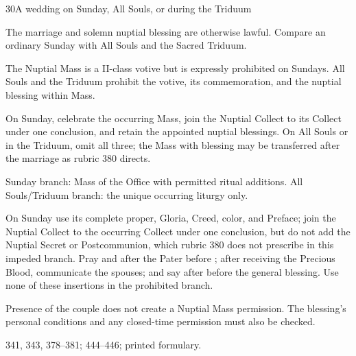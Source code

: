 \begin{casefile}{30}{A wedding on Sunday, All Souls, or during the Triduum}
\item[Calendar facts] The marriage and solemn nuptial blessing are otherwise lawful.  Compare an ordinary Sunday with All Souls and the Sacred Triduum.
\item[Ranks and rows] The Nuptial Mass is a II-class votive but is expressly prohibited on Sundays.  All Souls and the Triduum prohibit the votive, its commemoration, and the nuptial blessing within Mass.
\item[Impeded item] On Sunday, celebrate the occurring Mass, join the Nuptial Collect to its Collect under one conclusion, and retain the appointed nuptial blessings.  On All Souls or in the Triduum, omit all three; the Mass with blessing may be transferred after the marriage as rubric 380 directs.
\item[Mass category] Sunday branch: Mass of the Office with permitted ritual additions.  All Souls/Triduum branch: the unique occurring liturgy only.
\item[Assembly] On Sunday use its complete proper, Gloria, Creed, color, and Preface; join the Nuptial Collect to the occurring Collect under one conclusion, but do not add the Nuptial Secret or Postcommunion, which rubric 380 does not prescribe in this impeded branch.  Pray  and  after the Pater before ; after receiving the Precious Blood, communicate the spouses; and say  after  before the general blessing.  Use none of these insertions in the prohibited branch.
\item[Boundary] Presence of the couple does not create a Nuptial Mass permission.  The blessing's personal conditions and any closed-time permission must also be checked.
\item[Rubric locus] 341, 343, 378--381; 444--446; printed  formulary.
\end{casefile}

